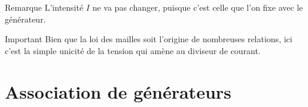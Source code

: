 \documentclass[../main/main.tex]{subfiles}
\begin{document}
\begin{tcbraster}[raster columns=2, raster equal height=rows]
    \begin{NCrema}{Remarque}
        L'intensité $I$ ne va pas changer, puisque c'est celle que l'on fixe
        avec le générateur.
    \end{NCrema}
    \begin{NCror}{Important}
        Bien que la loi des mailles soit l'origine de nombreuses relations, ici
        c'est la simple unicité de la tension qui amène au diviseur de courant.
    \end{NCror}
\end{tcbraster}
\vfill

\section{Association de générateurs}
\end{document}
